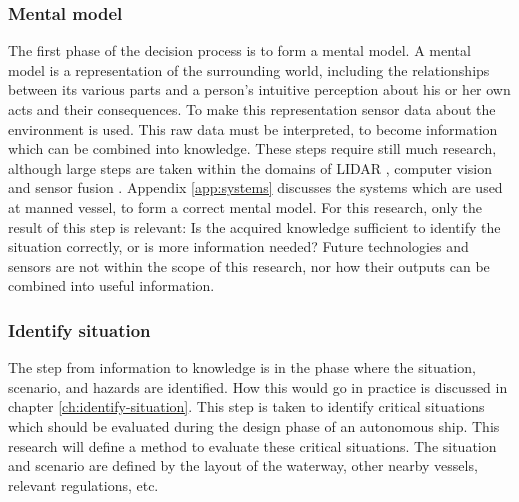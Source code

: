 \subsubsection{Mental model}
The first phase of the decision process is to form a mental model. A mental model is a representation of the surrounding world, including the relationships between its various parts and a person's intuitive perception about his or her own acts and their consequences.
To make this representation sensor data about the environment is used. This raw data must be interpreted, to become information which can be combined into knowledge. 
These steps require still much research, although large steps are taken within the domains of LIDAR \cite{Cameron2017}, computer vision \cite{Marr2017} and sensor fusion \cite{Hoffman2018}. Appendix \ref{app:systems} discusses the systems which are used at manned vessel, to form a correct mental model. For this research, only the result of this step is relevant: Is the acquired knowledge sufficient to identify the situation correctly, or is more information needed?
Future technologies and sensors are not within the scope of this research, nor how their outputs can be combined into useful information. 

\subsubsection{Identify situation}
The step from information to knowledge is in the phase where the situation, scenario, and hazards are identified. How this would go in practice is discussed in chapter \ref{ch:identify-situation}. This step is taken to identify critical situations which should be evaluated during the design phase of an autonomous ship. 
This research will define a method to evaluate these critical situations. The situation and scenario are defined by the layout of the waterway, other nearby vessels, relevant regulations, etc.

